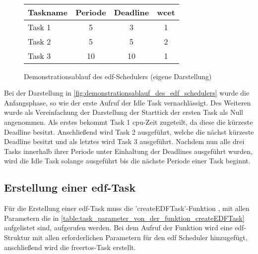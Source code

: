 \documentclass[../EDF Master Thesis.tex]{subfiles}
\begin{document}
\begin{figure}[ht!]
\begin{tikzpicture}
        \end{tikzpicture}\\
        \vspace {1cm}
        \begin{tabular}{l|c|c|c}
            Taskname & Periode & Deadline & \ac{wcet} \\
            \hline
            Task 1 & 5 & 3 & 1 \\
            Task 2 & 5 & 5 & 2 \\
            Task 3 & 10 & 10 & 1 
        \end{tabular}
        \caption[Demonstrationsablauf des \ac{edf}-Schedulers]{Demonstrationsablauf des \ac{edf}-Schedulers (eigene Darstellung)}
        \label{fig:demonstrationsablauf_des_edf_schedulers}
    \end{figure}

    Bei der Darstellung in \autoref{fig:demonstrationsablauf_des_edf_schedulers} wurde die Anfangsphase, so wie der erste Aufruf der Idle Task vernachlässigt.
    Des Weiteren wurde als Vereinfachung der Darstellung der Starttick der ersten Task als Null angenommen.
    Als erstes bekommt Task 1 \ac{cpu}-Zeit zugeteilt, da diese die kürzeste Deadline besitzt.
    Anschließend wird Task 2 ausgeführt, welche die nächst kürzeste Deadline besitzt und als letztes wird Task 3 ausgeführt.
    Nachdem nun alle drei Tasks innerhalb ihrer Periode unter Einhaltung der Deadlines ausgeführt wurden, wird die Idle Task solange ausgeführt bis die nächste Periode einer Task beginnt.

\clearpage

\subsection{Erstellung einer \acf{edf}-Task} \label{section:erstellung_einer_edf_task}

    Für die Erstellung einer \ac{edf}-Task muss die 'createEDFTask'-Funktion , mit allen Parametern die in \autoref{table:task_parameter_von_der_funktion_createEDFTask} aufgelistet sind, aufgerufen werden.
    Bei dem Aufruf der Funktion wird eine \ac{edf}-Struktur mit allen erforderlichen Parametern für den \ac{edf} Scheduler hinzugefügt, anschließend wird die \ac{freertos}-Task erstellt.
\end{document}
